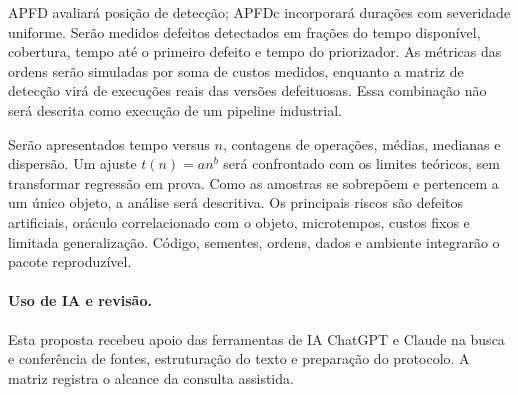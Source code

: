 \documentclass[12pt]{article}
\begin{document}
APFD avaliará posição de detecção; APFDc incorporará durações com severidade uniforme. Serão medidos defeitos detectados em frações do tempo disponível, cobertura, tempo até o primeiro defeito e tempo do priorizador. As métricas das ordens serão simuladas por soma de custos medidos, enquanto a matriz de detecção virá de execuções reais das versões defeituosas. Essa combinação não será descrita como execução de um pipeline industrial.

Serão apresentados tempo versus $n$, contagens de operações, médias, medianas e dispersão. Um ajuste $t(n)=an^b$ será confrontado com os limites teóricos, sem transformar regressão em prova. Como as amostras se sobrepõem e pertencem a um único objeto, a análise será descritiva. Os principais riscos são defeitos artificiais, oráculo correlacionado com o objeto, microtempos, custos fixos e limitada generalização. Código, sementes, ordens, dados e ambiente integrarão o pacote reproduzível.

\paragraph{Uso de IA e revisão.} Esta proposta recebeu apoio das ferramentas de IA ChatGPT e Claude na busca e conferência de fontes, estruturação do texto e preparação do protocolo. A matriz registra o alcance da consulta assistida.


\end{document}
